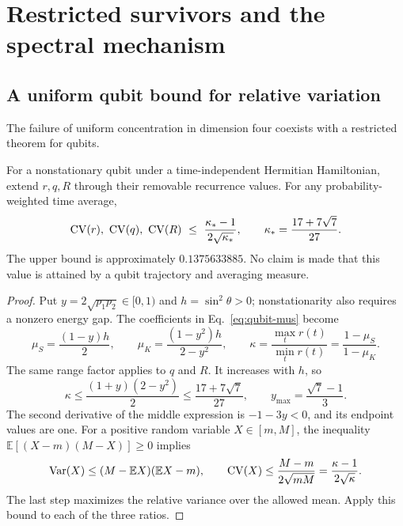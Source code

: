 \section{Restricted survivors and the spectral mechanism}\label{sec:survivors}
\subsection{A uniform qubit bound for relative variation}
The failure of uniform concentration in dimension four coexists with a
restricted theorem for qubits.

\begin{proposition}\label{prop:qubit-cv}
For a nonstationary qubit under a time-independent Hermitian Hamiltonian,
extend $r,q,R$ through their removable recurrence values. For any
probability-weighted time average,
\begin{equation}\label{eq:qubit-cv}
 \operatorname{CV}(r),\ \operatorname{CV}(q),\ \operatorname{CV}(R)
 \ \le\ \frac{\kappa_*-1}{2\sqrt{\kappa_*}},
 \qquad \kappa_*=\frac{17+7\sqrt7}{27}.
\end{equation}
The upper bound is approximately $0.1375633885$. No claim is made that
this value is attained by a qubit trajectory and averaging measure.
\end{proposition}
\begin{proof}
Put $y=2\sqrt{p_1p_2}\in[0,1)$ and $h=\sin^2\theta>0$; nonstationarity
also requires a nonzero energy gap. The coefficients in
Eq.~\eqref{eq:qubit-mus} become
\begin{equation}\label{eq:qubit-range}
 \mu_S=\frac{(1-y)h}{2},\qquad
 \mu_K=\frac{(1-y^2)h}{2-y^2},\qquad
 \kappa=\frac{\max_t r(t)}{\min_t r(t)}
 =\frac{1-\mu_S}{1-\mu_K}.
\end{equation}
The same range factor applies to $q$ and $R$. It increases with $h$, so
\begin{equation}\label{eq:kappa-max}
 \kappa\le\frac{(1+y)(2-y^2)}2
 \le\frac{17+7\sqrt7}{27},\qquad
 y_{\max}=\frac{\sqrt7-1}{3}.
\end{equation}
The second derivative of the middle expression is $-1-3y<0$, and its
endpoint values are one. For a positive random variable $X\in[m,M]$,
the inequality $\mathbb E[(X-m)(M-X)]\ge0$ implies
\begin{equation}\label{eq:bounded-variance}
 \operatorname{Var}(X)\le(M-\mathbb EX)(\mathbb EX-m),\qquad
 \operatorname{CV}(X)\le\frac{M-m}{2\sqrt{mM}}
 =\frac{\kappa-1}{2\sqrt\kappa}.
\end{equation}
The last step maximizes the relative variance over the allowed mean.
Apply this bound to each of the three ratios.
\end{proof}

